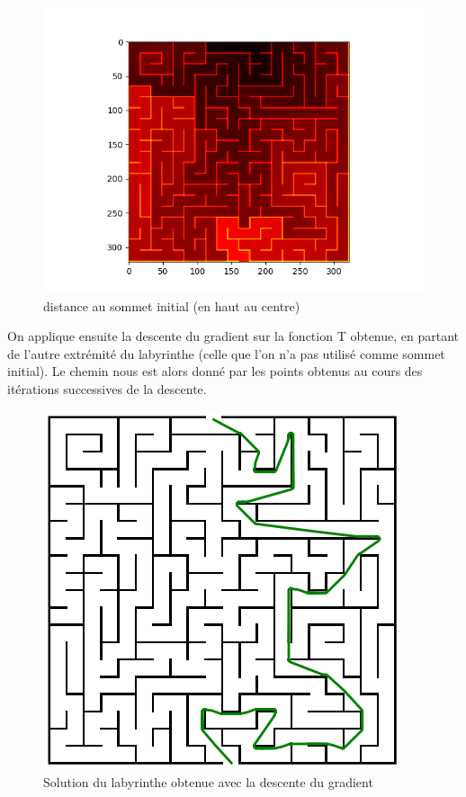 \documentclass{article}
\begin{document}
\begin{figure}[h]
	\begin{center}
		\includegraphics[scale=0.55]{../result/maze_T.png}
		\caption{distance au sommet initial (en haut au centre)}
	\end{center}
\end{figure}

On applique ensuite la descente du gradient sur la fonction T obtenue, en partant de l'autre extrémité du labyrinthe (celle que l'on n'a pas utilisé comme sommet initial). Le chemin nous est alors donné par les points obtenus au cours des itérations successives de la descente.

\begin{figure}[h]
	\begin{center}
		\includegraphics[scale=0.55]{../result/geo_maze.png}
		\caption{Solution du labyrinthe obtenue avec la descente du gradient}
	\end{center}
\end{figure}
\end{document}
